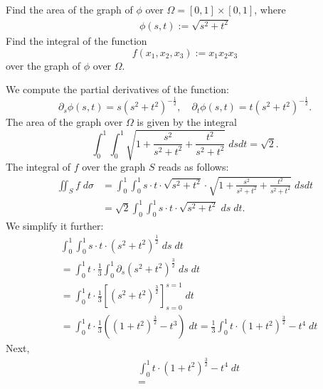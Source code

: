 \documentclass[11pt]{article}
\begin{document}



\begin{exercise}
    Find the area of the graph of $\phi$ over $\Omega = [0,1] \times [0,1]$, where 
    \begin{gather*}
        \phi(s,t) := \sqrt{ s^2 + t^2 }
    \end{gather*}
    Find the integral of the function 
    \[
        f(x_1,x_2,x_3) := x_1 x_2 x_3
    \]
    over the graph of $\phi$ over $\Omega$. 
\end{exercise}
\begin{solution}
    We compute the partial derivatives of the function:
    \[
        \partial_s \phi(s,t) = s ( s^2 + t^2 )^{- \frac 1 2},
        \quad 
        \partial_t \phi(s,t) = t ( s^2 + t^2 )^{- \frac 1 2}.
    \]
    The area of the graph over $\Omega$ is given by the integral 
    \[
        \int_0^1 \int_0^1 \sqrt{ 1 + \frac{ s^2 }{ s^2 + t^2 } + \frac{ t^2 }{ s^2 + t^2 } } \;dsdt = \sqrt{2}.
    \]
    The integral of $f$ over the graph $S$ reads as follows:
    \begin{align*}
        \iint_S f \;d\sigma
        &=
        \int_0^1 \int_0^1 s \cdot t \cdot \sqrt{ s^2 + t^2 } \cdot \sqrt{ 1 + \frac{ s^2 }{ s^2 + t^2 } + \frac{ t^2 }{ s^2 + t^2 } } \;dsdt
        \\&=
        \sqrt{2}
        \int_0^1 \int_0^1 s \cdot t \cdot \sqrt{ s^2 + t^2 } \;ds \;dt.
    \end{align*}
    We simplify it further:
    \begin{align*}
        &
        \int_0^1 \int_0^1 s \cdot t \cdot \left( s^2 + t^2 \right)^{\frac 1 2} \;ds \;dt
        \\&
        =
        \int_0^1 t \cdot \frac 1 3 \int_0^1 \partial_s ( s^2 + t^2 )^{\frac 3 2} \;ds \;dt
        \\&
        =
        \int_0^1 t \cdot \frac 1 3 \left[ ( s^2 + t^2 )^{\frac 3 2} \right]_{s=0}^{s=1} \;dt
        \\&
        =
        \int_0^1 t \cdot \frac 1 3 \left( ( 1 + t^2 )^{\frac 3 2} - t^{3} \right) \;dt
        =
        \frac 1 3 
        \int_0^1 t \cdot ( 1 + t^2 )^{\frac 3 2} - t^{4} \;dt
    \end{align*}
    Next, 
    \begin{align*}
        &
        \int_0^1 t \cdot ( 1 + t^2 )^{\frac 3 2} - t^{4} \;dt
        \\&
        =

\end{align*}
\end{solution}
\end{document}
